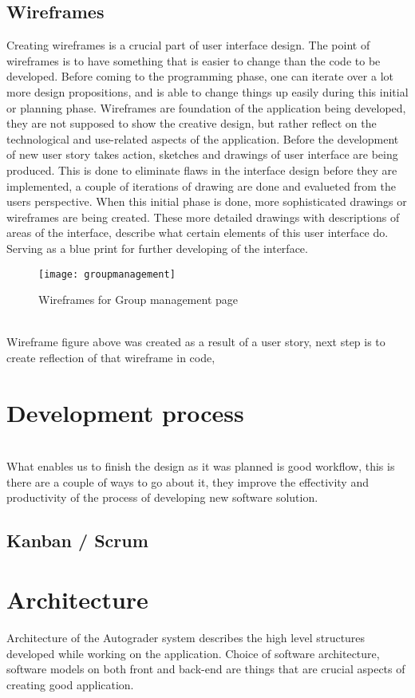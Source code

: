 \subsection{Wireframes}
Creating wireframes is a crucial part of user interface design. The point of wireframes is to have something that is easier to change than the code to be developed. Before coming to the programming phase, one can iterate over a lot more design propositions, and is able to change things up easily during this initial or planning phase. Wireframes are foundation of the application being developed, they are not supposed to show the creative design, but rather reflect on the technological and use-related aspects of the application. Before the development of new user story takes action, sketches and drawings of user interface are being produced. This is done to eliminate flaws in the interface design before they are implemented, a couple of iterations of drawing are done and evalueted from the users perspective. When this initial phase is done, more sophisticated drawings or wireframes are being created. These more detailed drawings with descriptions of areas of the interface, describe what certain elements of this user interface do. Serving as a blue print for further developing of the interface.
\begin{figure}[h]
  {\texttt{[image: groupmanagement]}}
  \caption{Wireframes for Group management page}
  \label{fig:groupmanagement}
\end{figure}
\\Wireframe figure above was created as a result of a user story, next step is to create reflection of that wireframe in code, 


\section{Development process}
\\
What enables us to finish the design as it was planned is good workflow, this is there are a couple of ways to go about it, they improve the effectivity and productivity of the process of developing new software solution.
\subsection{Kanban / Scrum}

\section{Architecture}
Architecture of the Autograder system describes the high level structures developed while working on the application. Choice of software architecture, software models on both front and back-end are things that are crucial aspects of creating good application.
